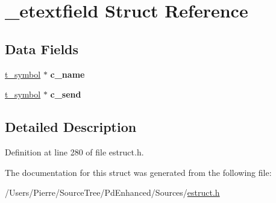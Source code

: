 \hypertarget{struct__etextfield}{\section{\-\_\-etextfield Struct Reference}
\label{struct__etextfield}
}
\subsection*{Data Fields}
\begin{DoxyCompactItemize}
\item 
\hypertarget{struct__etextfield_a6b1d595c3eed41231261cc949de6c059}{\hyperlink{struct__symbol}{t\-\_\-symbol} $\ast$ {\bfseries c\-\_\-name}}\label{struct__etextfield_a6b1d595c3eed41231261cc949de6c059}

\item 
\hypertarget{struct__etextfield_a8b8515ab22b24ef7b726fc06af1254fe}{\hyperlink{struct__symbol}{t\-\_\-symbol} $\ast$ {\bfseries c\-\_\-send}}\label{struct__etextfield_a8b8515ab22b24ef7b726fc06af1254fe}

\end{DoxyCompactItemize}


\subsection{Detailed Description}


Definition at line 280 of file estruct.\-h.



The documentation for this struct was generated from the following file\-:\begin{DoxyCompactItemize}
\item 
/\-Users/\-Pierre/\-Source\-Tree/\-Pd\-Enhanced/\-Sources/\hyperlink{estruct_8h}{estruct.\-h}\end{DoxyCompactItemize}
